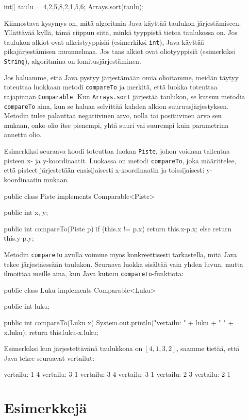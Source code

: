 \begin{code}
int[] taulu = {4,2,5,8,2,1,5,6};
Arrays.sort(taulu);
\end{code}

Kiinnostava kysymys on, mitä algoritmia Java käyttää
taulukon järjes\-tämiseen.
Yllättävää kyllä, tämä riippuu siitä, minkä tyyppistä tietoa
taulukossa on.
Jos taulukon alkiot ovat alkeistyyppisiä
(esimerkiksi \texttt{int}), Java käyttää 
pikajärjestämisen muunnelmaa.
Jos taas alkiot ovat oliotyyppisiä
(esimerkiksi \texttt{String}),
algoritmina on lomitusjärjestäminen.

Jos haluamme, että Java pystyy järjestämään omia olioitamme,
meidän täytyy toteuttaa luokkaan metodi \texttt{compareTo} ja
merkitä, että luokka toteuttaa rajapinnan \texttt{Comparable}.
Kun \texttt{Arrays.sort} järjestää taulukon,
se kutsuu metodia \texttt{compareTo} aina, kun se haluaa selvittää
kahden alkion suuruusjärjestyksen.
Metodin tulee palauttaa negatiivinen arvo, nolla tai positiivinen arvo
sen mukaan, onko olio itse pienempi, yhtä suuri vai suurempi
kuin parametrina annettu olio.

Esimerkiksi seuraava koodi toteuttaa luokan \texttt{Piste},
johon voidaan tallentaa pisteen x- ja y-koordinaatit.
Luokassa on metodi \texttt{compareTo}, joka määrittelee,
että pisteet järjestetään ensisijaisesti x-koordinaatin ja
toissijaisesti y-koordinaatin mukaan.

\begin{code}
public class Piste implements Comparable<Piste> {
    public int x, y;

    public int compareTo(Piste p) {
        if (this.x != p.x) return this.x-p.x;
        else return this.y-p.y;
    }
}
\end{code}

Metodin \texttt{compareTo} avulla voimme myös konkreettisesti
tarkastella, mitä Java tekee järjestäessään taulukon.
Seuraava luokka sisältää vain yhden luvun,
mutta ilmoittaa meille aina, kun Java kutsuu
\texttt{compareTo}-funktiota:

\begin{code}
public class Luku implements Comparable<Luku> {
    public int luku;

    public int compareTo(Luku x) {
        System.out.println("vertailu: " + luku + " " + x.luku);
        return this.luku-x.luku;
    }
}
\end{code}

Esimerkiksi kun järjestettävänä taulukkona on $[4,1,3,2]$,
saamme tietää, että Java tekee seuraavat vertailut:

\begin{code}
vertailu: 1 4
vertailu: 3 1
vertailu: 3 4
vertailu: 3 1
vertailu: 2 3
vertailu: 2 1
\end{code}

\section{Esimerkkejä}
